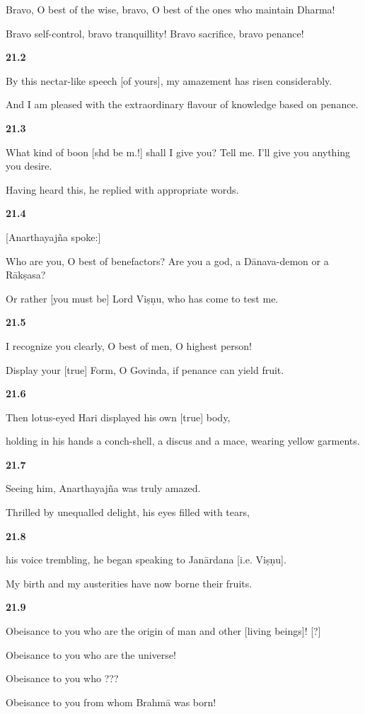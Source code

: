 \documentclass[12pt]{article} %
\begin{document}
    Bravo, O best of the wise, bravo, O best of the ones who maintain Dharma!  

     Bravo self-control, bravo tranquillity!  Bravo sacrifice, bravo penance! 

\textbf{21.2} 

By this nectar-like speech [of yours], my amazement has risen 
considerably. 

     And I am pleased with the extraordinary flavour of knowledge based on penance. 

\textbf{21.3}

 What kind of boon [shd be m.!] shall I give you? Tell me. I'll give you anything you desire. 

     Having heard this, he replied with appropriate words. 

\textbf{21.4}

 [Anarthayajña spoke:] 

     Who are you, O best of benefactors? Are you a god, a Dānava-demon or a Rākṣasa? 

     Or rather [you must be] Lord Viṣṇu, who has come to test me. 

\textbf{21.5}

 I recognize you clearly, O best of men, O highest person! 

     Display your [true] Form, O Govinda, if penance can yield fruit. 

\textbf{21.6}

 Then lotus-eyed Hari displayed his own [true] body, 

     holding in his hands a conch-shell, a discus and a mace, wearing yellow garments. 

\textbf{21.7}

 Seeing him, Anarthayajña was truly amazed. 

     Thrilled by unequalled delight, his eyes filled with tears, 

\textbf{21.8}

 his voice trembling, he began speaking to Janārdana [i.e. Viṣṇu]. 

     My birth and my austerities have now borne their fruits. 

\textbf{21.9}

 Obeisance to you who are the origin of man and other [living beings]! [?] 
    
     Obeisance to you who are the universe! 
    
     Obeisance to you who ???  
    
      Obeisance to you from whom Brahmā was born! 
\end{document}
